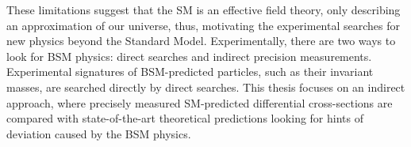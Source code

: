 These limitations suggest that the SM is an effective field theory, only describing an approximation of our universe, thus, motivating the experimental searches for new physics beyond the Standard Model. Experimentally, there are two ways to look for BSM physics: direct searches and indirect precision measurements. Experimental signatures of BSM-predicted particles, such as their invariant masses, are searched directly by direct searches. This thesis focuses on an indirect approach, where precisely measured SM-predicted differential cross-sections are compared with state-of-the-art theoretical predictions looking for hints of deviation caused by the BSM physics. 